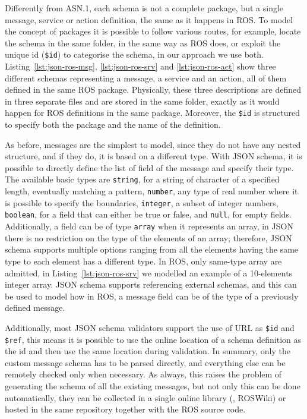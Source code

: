 Differently from ASN.1, each schema is not a complete package, but a single message, service or action definition, the same as it happens in ROS. To model the concept of packages it is possible to follow various routes, for example, locate the schema in the same folder, in the same way as ROS does, or exploit the unique id (\texttt{\$id}) to categorise the schema, in our approach we use both. Listing~\ref{lst:json-ros-msg}, \ref{lst:json-ros-srv} and \ref{lst:json-ros-act} show three different schemas representing a message, a service and an action, all of them defined in the same ROS package. Physically, these three descriptions are defined in three separate files and are stored in the same folder, exactly as it would happen for ROS definitions in the same package. Moreover, the \texttt{\$id} is structured to specify both the package and the name of the definition.

As before, messages are the simplest to model, since they do not have any nested structure, and if they do, it is based on a different type. With JSON schema, it is possible to directly define the list of field of the message and specify their type. The available basic types are \texttt{string}, for a string of character of a specified length, eventually matching a pattern, \texttt{number}, any type of real number where it is possible to specify the boundaries, \texttt{integer}, a subset of integer numbers, \texttt{boolean}, for a field that can either be true or false, and \texttt{null}, for empty fields. Additionally, a field can be of type \texttt{array} when it represents an array, in JSON there is no restriction on the type of the elements of an array; therefore, JSON schema supports multiple options ranging from all the elements having the same type to each element has a different type. In ROS, only same-type array are admitted, in Listing~\ref{lst:json-ros-srv} we modelled an example of a 10-elements integer array. JSON schema supports referencing external schemas, and this can be used to model how in ROS, a message field can be of the type of a previously defined message.

Additionally, most JSON schema validators support the use of URL as \texttt{\$id} and \texttt{\$ref}, this means it is possible to use the online location of a schema definition as the id and then use the same location during validation. In summary, only the custom message schema has to be parsed directly, and everything else can be remotely checked only when necessary. As always, this raises the problem of generating the schema of all the existing messages, but not only this can be done automatically, they can be collected in a single online library (\eg, ROSWiki) or hosted in the same repository together with the ROS source code. 


